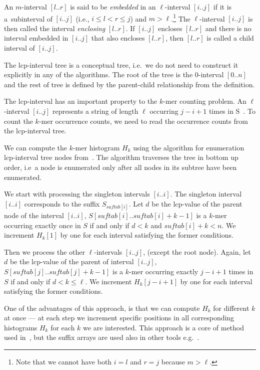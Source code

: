 \begin{definition}
  An $m$-interval $[l..r]$ is said to be \emph{embedded} in an $\ell$-interval $[i..j]$ if it is a~subinterval of $[i..j]$ (i.e., $i \leq l < r \leq j $) and $m > \ell$.\footnote{Note that we cannot have both $i = l$ and $r = j$ because $m > \ell$.}
  The $\ell$-interval $[i..j ]$ is then called the interval \emph{enclosing} $[l..r]$. If $[i..j]$ encloses $[l..r]$ and there is no interval embedded in $[i..j]$ that also encloses $[l..r]$, then $[l..r]$ is called a child interval of $[i..j]$.
\end{definition}

The lcp-interval tree is a conceptual tree, i.e.\ we do not need to construct it explicitly in any of the algorithms. The root of the tree is the $0$-interval $[0..n]$ and the rest of tree is defined by the parent-child relationship from the definition.

The lcp-interval has an important property to the $k$-mer counting problem. An $\ell$-interval $[i..j]$ represents a string of length $\ell$ occurring $j - i + 1$ times in S~\cite{tallymer}. To count the $k$-mer occurrence counts, we need to read the occurrence counts from the lcp-interval tree.

We can compute the $k$-mer histogram $H_k$ using the algorithm for enumeration lcp-interval tree nodes from~\cite{enhancedsuffixarrays}. The algorithm traverses the tree in bottom up order, i.e\ a node is enumerated only after all nodes in its subtree have been enumerated.

We start with processing the singleton intervals $[i..i]$. The singleton interval $[i..i]$ corresponds to the suffix $S_{suftab[i]}$. Let $d$ be the lcp-value of the parent node of the interval $[i..i]$, $S[suftab[i]..suftab[i]+k-1]$ is a $k$-mer occurring exactly once in $S$ if and only if $d < k$ and $suftab[i]+k < n$. We increment $H_k[1]$ by one for each interval satisfying the former conditions.

Then we process the other $\ell$-intervals $[i..j]$, (except the root node). Again, let $d$ be the lcp-value of the parent of interval $[i..j]$, $S[suftab[j]..suftab[j] + k - 1]$ is a $k$-mer occurring exactly $j - i + 1$ times in $S$ if and only if $d < k \leq \ell$. We increment $H_k[j-i+1]$ by one for each interval satisfying the former conditions.

One of the advantages of this approach, is that we can compute $H_k$ for different $k$ at once --- at each step we increment specific positions in all corresponding histograms $H_k$ for each $k$ we are interested. This approach is a core of method used in~\cite{tallymer}, but the suffix arrays are used also in other tools e.g.~\cite{jellyfish}.

